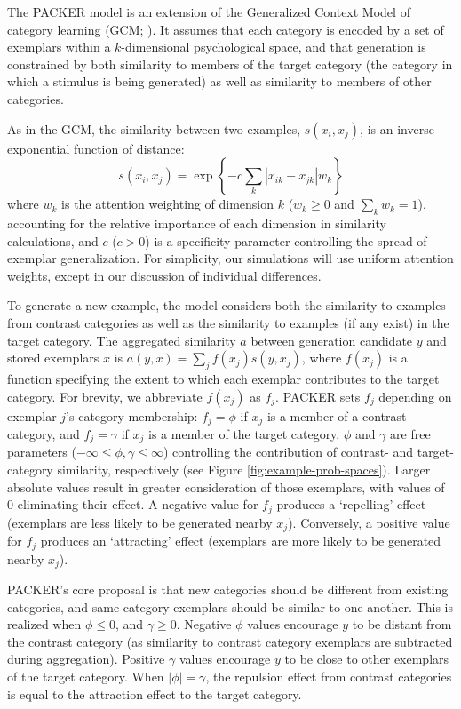 \documentclass[10pt,letterpaper]{article}
\begin{document}
The PACKER model is an extension of the Generalized Context Model of category learning (GCM; \citealp{nosofsky1984choice}). It assumes that each category is encoded by a set of exemplars within a $k$-dimensional psychological space, and that generation is constrained by both similarity to members of the target category (the category in which a stimulus is being generated) as well as similarity to members of other categories. 

As in the GCM, the similarity between two examples, $s\left(x_i, x_j\right)$, is an inverse-exponential function of distance:
\begin{equation}
  s\left(x_i,x_j\right) = \exp \left\{ -c \sum_{k}{ \left| x_{ik} - x_{jk} \right|}w_k \right\}
  \label{eq:similarity}
\end{equation}
where $w_k$ is the attention weighting of dimension $k$ ($w_k \geq 0$ and $\sum_k{w_k} = 1$), accounting for the relative importance of each dimension in similarity calculations, and $c$ ($c>0$) is a specificity parameter controlling the spread of exemplar generalization. For simplicity, our simulations will use uniform attention weights, except in our discussion of individual differences.  

To generate a new example, the model considers both the similarity to examples from contrast categories as well as the similarity to examples (if any exist) in the target category. The aggregated similarity $a$ between generation candidate $y$ and stored exemplars $x$ is $a(y, x) = \sum_j{f(x_j) s(y, x_j)}$, where $f(x_j)$ is a function specifying the extent to which each exemplar contributes to the target category. For brevity, we abbreviate $f(x_j)$ as $f_j$. PACKER sets $f_j$ depending on exemplar $j$'s category membership: $f_j = \phi$ if $x_j$ is a member of a contrast category, and $f_j = \gamma$ if $x_j$ is a member of the target category. $\phi$ and $\gamma$ are free parameters ($-\infty \leq \phi, \gamma \leq \infty$) controlling the contribution of contrast- and target-category similarity, respectively (see Figure \ref{fig:example-prob-spaces}). Larger absolute values result in greater consideration of those exemplars, with values of 0 eliminating their effect. A negative value for $f_j$ produces a `repelling' effect (exemplars are less likely to be generated nearby $x_j$). Conversely, a positive value for $f_j$ produces an `attracting' effect (exemplars are more likely to be generated nearby $x_j$). 

PACKER's core proposal is that new categories should be different from existing categories, and same-category exemplars should be similar to one another. This is realized when $\phi \leq 0$, and $\gamma \geq 0$. Negative $\phi$ values encourage $y$ to be distant from the contrast category (as similarity to contrast category exemplars are subtracted during aggregation). Positive $\gamma$ values encourage $y$ to be close to other exemplars of the target category. When $|\phi| = \gamma$, the repulsion effect from contrast categories is equal to the attraction effect to the target category.
\end{document}
